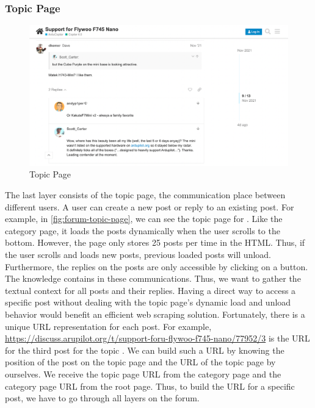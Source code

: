 \subsubsection{Topic Page}
\begin{figure}
    \begin{center}
        \includegraphics[width=\textwidth]{figures/data_collection/forum_topic_page}
        \caption{Topic Page}\label{fig:forum-topic-page}
    \end{center}
\end{figure}
The last layer consists of the topic page, the communication place between different users.
A user can create a new post or reply to an existing post.
For example, in \autoref{fig:forum-topic-page}, we can see the topic page for .
Like the category page, it loads the posts dynamically when the user scrolls to the bottom.
However, the page only stores 25 posts per time in the \ac{HTML}.
Thus, if the user scrolls and loads new posts, previous loaded posts will unload.
Furthermore, the replies on the posts are only accessible by clicking on a  button.
The knowledge contains in these communications.
Thus, we want to gather the textual context for all posts and their replies.
Having a direct way to access a specific post without dealing with the topic page's dynamic load and unload behavior would benefit an efficient web scraping solution.
Fortunately, there is a unique \ac{URL} representation for each post.
For example, \url{https://discuss.arupilot.org/t/support-foru-flywoo-f745-nano/77952/3} is the \ac{URL} for the third post for the topic .
We can build such a \ac{URL} by knowing the position of the post on the topic page and the \ac{URL} of the topic page by ourselves.
We receive the topic page \ac{URL} from the category page and the category page \ac{URL} from the root page.
Thus, to build the \ac{URL} for a specific post, we have to go through all layers on the forum.

